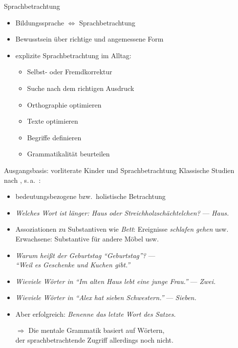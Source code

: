 \begin{frame}
  {Sprachbetrachtung}
  \pause
  \begin{itemize}[<+->]
    \item Bildungssprache $\Leftrightarrow$ Sprachbetrachtung
      \vspace{\baselineskip}
    \item Bewusstsein über richtige und angemessene Form
      \vspace{\baselineskip}
    \item explizite Sprachbetrachtung im Alltag:
      \begin{itemize}[<+->]
        \item Selbst- oder Fremdkorrektur
        \item Suche nach dem richtigen Ausdruck
        \item Orthographie optimieren
        \item Texte optimieren
        \item Begriffe definieren
        \item Grammatikalität beurteilen
      \end{itemize}
  \end{itemize}
\end{frame}

\begin{frame}
  {Ausgangsbasis: vorliterate Kinder und Sprachbetrachtung}
  \pause
  Klassische Studien nach \citet{Bredel2013}, s.\,a.\ \citet[57--58]{Schaefer2018}:\\
  \vspace{\baselineskip}
  \pause
  \begin{itemize}[<+->]
    \item \alert{bedeutungsbezogene} bzw.\ \alert{holistische} Betrachtung
    \item \textit{Welches Wort ist länger: Haus oder Streichholzschächtelchen?} --- \textit{Haus.}
    \item Assoziationen zu Substantiven wie \textit{Bett}: \alert{Ereignisse} \textit{schlafen gehen} usw.\\
      Erwachsene: \alert{Substantive} für andere Möbel usw.
    \item \textit{Warum heißt der Geburtstag  "`Geburtstag"'?} ---\\
      \textit{"`Weil es Geschenke und Kuchen gibt."'}
    \item \textit{Wieviele Wörter in "`Im alten Haus lebt eine junge Frau."'} --- \textit{Zwei.}
    \item \textit{Wieviele Wörter in "`Alex hat sieben Schwestern."'} --- \textit{Sieben.}
      \vspace{\baselineskip}
    \item Aber \alert{erfolgreich}: \textit{Benenne das letzte Wort des Satzes.}
    \item[$\Rightarrow$] Die mentale Grammatik basiert auf Wörtern,\\
      der sprachbetrachtende Zugriff allerdings noch nicht.
  \end{itemize}
\end{frame}

